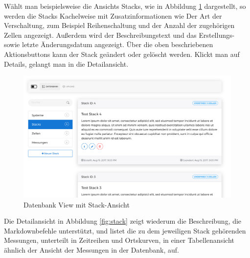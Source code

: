 Wählt man beispielsweise die Ansichts Stacks, wie in Abbildung \ref{fig:stacks} dargestellt, so werden die Stacks Kachelweise mit Zusatzinformationen wie Der Art der Verschaltung, zum Beispiel Reihenschaltung und der Anzahl der zugehörigen Zellen angezeigt. Außerdem wird der Beschreibungstext und das Erstellungs- sowie letzte Änderungsdatum angezeigt. Über die oben beschriebenen Aktionsbuttons kann der Stack geändert oder gelöscht werden. Klickt man auf Details, gelangt man in die Detailansicht.

\begin{figure}
\centering
\includegraphics[width=\textwidth]{Figures/stacks}
\caption{Datenbank View mit Stack-Ansicht}
\label{fig:stacks}
\end{figure}

Die Detailansicht in Abbildung \ref{fig:stack} zeigt wiederum die Beschreibung, die Markdownbefehle unterstützt, und listet die zu dem jeweiligen Stack gehörenden Messungen, unterteilt in Zeitreihen und Ortskurven, in einer Tabellenansicht ähnlich der Ansicht der Messungen in der Datenbank, auf.

